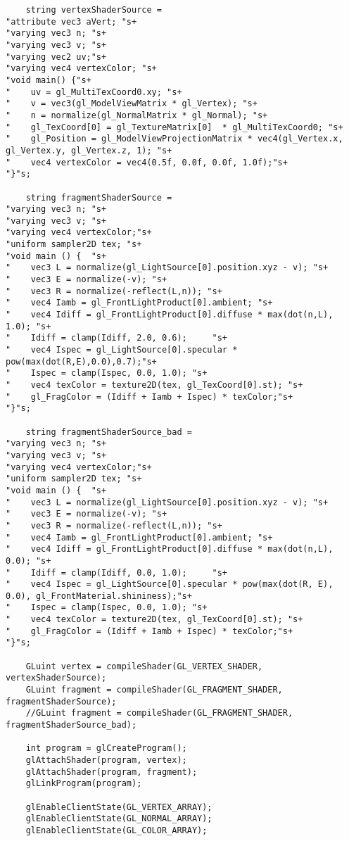 \documentclass[a4paper, 14pt]{extarticle}
\begin{document}
\begin{verbatim}
    string vertexShaderSource =
"attribute vec3 aVert; "s+
"varying vec3 n; "s+
"varying vec3 v; "s+
"varying vec2 uv;"s+
"varying vec4 vertexColor; "s+
"void main() {"s+
"    uv = gl_MultiTexCoord0.xy; "s+
"    v = vec3(gl_ModelViewMatrix * gl_Vertex); "s+
"    n = normalize(gl_NormalMatrix * gl_Normal); "s+
"    gl_TexCoord[0] = gl_TextureMatrix[0]  * gl_MultiTexCoord0; "s+
"    gl_Position = gl_ModelViewProjectionMatrix * vec4(gl_Vertex.x, gl_Vertex.y, gl_Vertex.z, 1); "s+
"    vec4 vertexColor = vec4(0.5f, 0.0f, 0.0f, 1.0f);"s+
"}"s;

    string fragmentShaderSource =
"varying vec3 n; "s+
"varying vec3 v; "s+
"varying vec4 vertexColor;"s+
"uniform sampler2D tex; "s+
"void main () {  "s+
"    vec3 L = normalize(gl_LightSource[0].position.xyz - v); "s+
"    vec3 E = normalize(-v); "s+
"    vec3 R = normalize(-reflect(L,n)); "s+
"    vec4 Iamb = gl_FrontLightProduct[0].ambient; "s+
"    vec4 Idiff = gl_FrontLightProduct[0].diffuse * max(dot(n,L), 1.0); "s+
"    Idiff = clamp(Idiff, 2.0, 0.6);     "s+
"    vec4 Ispec = gl_LightSource[0].specular * pow(max(dot(R,E),0.0),0.7);"s+
"    Ispec = clamp(Ispec, 0.0, 1.0); "s+
"    vec4 texColor = texture2D(tex, gl_TexCoord[0].st); "s+
"    gl_FragColor = (Idiff + Iamb + Ispec) * texColor;"s+
"}"s;

    string fragmentShaderSource_bad =
"varying vec3 n; "s+
"varying vec3 v; "s+
"varying vec4 vertexColor;"s+
"uniform sampler2D tex; "s+
"void main () {  "s+
"    vec3 L = normalize(gl_LightSource[0].position.xyz - v); "s+
"    vec3 E = normalize(-v); "s+
"    vec3 R = normalize(-reflect(L,n)); "s+
"    vec4 Iamb = gl_FrontLightProduct[0].ambient; "s+
"    vec4 Idiff = gl_FrontLightProduct[0].diffuse * max(dot(n,L), 0.0); "s+
"    Idiff = clamp(Idiff, 0.0, 1.0);     "s+
"    vec4 Ispec = gl_LightSource[0].specular * pow(max(dot(R, E), 0.0), gl_FrontMaterial.shininess);"s+
"    Ispec = clamp(Ispec, 0.0, 1.0); "s+
"    vec4 texColor = texture2D(tex, gl_TexCoord[0].st); "s+
"    gl_FragColor = (Idiff + Iamb + Ispec) * texColor;"s+
"}"s;

    GLuint vertex = compileShader(GL_VERTEX_SHADER, vertexShaderSource);
    GLuint fragment = compileShader(GL_FRAGMENT_SHADER, fragmentShaderSource);
    //GLuint fragment = compileShader(GL_FRAGMENT_SHADER, fragmentShaderSource_bad); 

    int program = glCreateProgram();
    glAttachShader(program, vertex);
    glAttachShader(program, fragment);
    glLinkProgram(program);

    glEnableClientState(GL_VERTEX_ARRAY);
    glEnableClientState(GL_NORMAL_ARRAY);
    glEnableClientState(GL_COLOR_ARRAY);


\end{verbatim}
\end{document}
